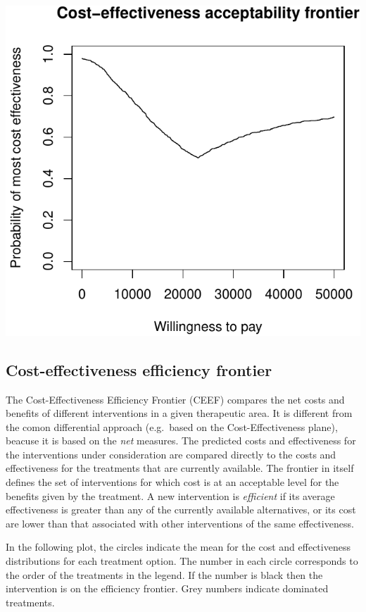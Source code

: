 \documentclass[]{article}
\begin{document}
\begin{center}\includegraphics{report_files/figure-latex/unnamed-chunk-6-1} \end{center}

\hypertarget{cost-effectiveness-efficiency-frontier}{%
\subsection{Cost-effectiveness efficiency
frontier}\label{cost-effectiveness-efficiency-frontier}}

The Cost-Effectiveness Efficiency Frontier (CEEF) compares the net costs
and benefits of different interventions in a given therapeutic area. It
is different from the comon differential approach (e.g.~based on the
Cost-Effectiveness plane), beacuse it is based on the \emph{net}
measures. The predicted costs and effectiveness for the interventions
under consideration are compared directly to the costs and effectiveness
for the treatments that are currently available. The frontier in itself
defines the set of interventions for which cost is at an acceptable
level for the benefits given by the treatment. A new intervention is
\emph{efficient} if its average effectiveness is greater than any of the
currently available alternatives, or its cost are lower than that
associated with other interventions of the same effectiveness.

In the following plot, the circles indicate the mean for the cost and
effectiveness distributions for each treatment option. The number in
each circle corresponds to the order of the treatments in the legend. If
the number is black then the intervention is on the efficiency frontier.
Grey numbers indicate dominated treatments.
\end{document}
